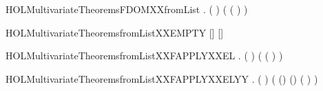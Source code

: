\newcommand{\HOLMultivariateTheoremsEVERYXXweaklyXXguarded}{\UseVerbatim{HOLMultivariateTheoremsEVERYXXweaklyXXguarded}}
\begin{SaveVerbatim}{HOLMultivariateTheoremsFDOMXXfromList}
\HOLTokenTurnstile{} \HOLSymConst{\HOLTokenForall{}} .
       (  \HOLSymConst{=}  ) \HOLSymConst{\HOLTokenImp{}}
       ( (  ) \HOLSymConst{=}  )
\end{SaveVerbatim}
\newcommand{\HOLMultivariateTheoremsFDOMXXfromList}{\UseVerbatim{HOLMultivariateTheoremsFDOMXXfromList}}
\begin{SaveVerbatim}{HOLMultivariateTheoremsfromListXXEMPTY}
\HOLTokenTurnstile{}  [] [] \HOLSymConst{=} 
\end{SaveVerbatim}
\newcommand{\HOLMultivariateTheoremsfromListXXEMPTY}{\UseVerbatim{HOLMultivariateTheoremsfromListXXEMPTY}}
\begin{SaveVerbatim}{HOLMultivariateTheoremsfromListXXFAPPLYXXEL}
\HOLTokenTurnstile{} \HOLSymConst{\HOLTokenForall{}}  .
         \HOLSymConst{\HOLTokenConj{}} (  \HOLSymConst{=}  ) \HOLSymConst{\HOLTokenConj{}}  \HOLSymConst{\HOLTokenLt{}}   \HOLSymConst{\HOLTokenImp{}}
       (    (  ) \HOLSymConst{=}   )
\end{SaveVerbatim}
\newcommand{\HOLMultivariateTheoremsfromListXXFAPPLYXXEL}{\UseVerbatim{HOLMultivariateTheoremsfromListXXFAPPLYXXEL}}
\begin{SaveVerbatim}{HOLMultivariateTheoremsfromListXXFAPPLYXXELYY}
\HOLTokenTurnstile{} \HOLSymConst{\HOLTokenForall{}}    .
       \HOLSymConst{\HOLTokenNeg{}}   \HOLSymConst{\HOLTokenConj{}}   \HOLSymConst{\HOLTokenConj{}} (  \HOLSymConst{=}  ) \HOLSymConst{\HOLTokenConj{}}
        \HOLSymConst{\HOLTokenLt{}}   \HOLSymConst{\HOLTokenImp{}}
       ( (\HOLSymConst{::}) (\HOLSymConst{::})  (  ) \HOLSymConst{=}   )
\end{SaveVerbatim}
